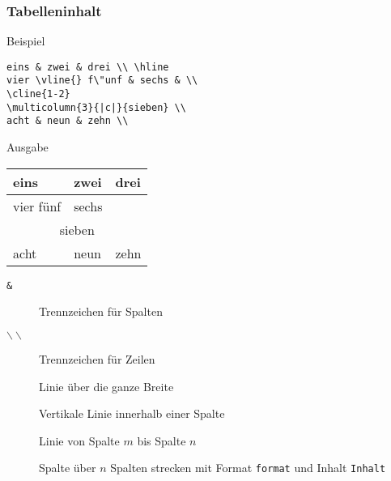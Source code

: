 \begin{frame}[c,fragile]
\frametitle{Tabelleninhalt}

\begin{minipage}{0.55\textwidth}
\begin{block}{Beispiel}
\begin{verbatim}
eins & zwei & drei \\ \hline
vier \vline{} f\"unf & sechs & \\
\cline{1-2}
\multicolumn{3}{|c|}{sieben} \\
acht & neun & zehn \\
\end{verbatim}
\end{block}
\end{minipage}
\hspace*{1ex}
\begin{minipage}{0.4\textwidth}
\begin{block}{Ausgabe}
\begin{tabular}{lll}
eins & zwei & drei \\ \hline
vier \vline{} f\"unf & sechs & \\
\cline{1-2}
\multicolumn{3}{|c|}{sieben} \\
acht & neun & zehn 
\end{tabular}
\end{block}
\end{minipage}

\begin{description}
\item[\texttt{\&}] Trennzeichen f\"ur Spalten
\item[$\mathtt{\backslash\backslash}$] Trennzeichen f\"ur Zeilen
\item[] Linie \"uber die ganze Breite
\item[] Vertikale Linie innerhalb einer Spalte
\item[] Linie von Spalte $m$ bis Spalte $n$
\item[] Spalte \"uber $n$ Spalten strecken mit Format \texttt{format} und Inhalt \texttt{Inhalt}
\end{description}

\end{frame}

